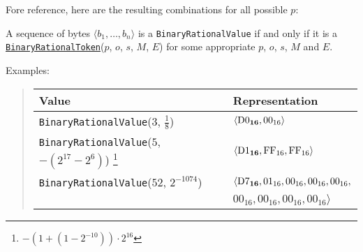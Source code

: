 \documentclass{dbor-article}
\newcommand{\HexNumber}[1]{\mathrm{#1}_{16}}
\newcommand{\DborSyntaxIdent}[1]{\texttt{#1}}
\newcommand{\DborSyntaxIdentRef}[1]{\hyperlink{sec:def:#1}{\DborSyntaxIdent{#1}}}
\newcommand{\DborFirstByte}[2]{\mathbf{\textcolor{#1}{\HexNumber{#2}}}}
\newcommand{\DborFirstByteNumber}[1]{\DborFirstByte{black}{#1}}
\newcommand{\DborNextByte}[1]{\HexNumber{#1}}
\begin{document}
    \smallskip
    \noindent
    Fore reference, here are the resulting combinations for all possible $p$:
    \nolinebreak
    \begin{quote}
    \end{quote}

    A sequence of bytes $\langle b_1, \ldots, b_n\rangle$ is a \DborSyntaxIdent{BinaryRationalValue} if and only if
    it is a \DborSyntaxIdentRef{BinaryRationalToken}($p$, $o$, $s$, $M$, $E$) for some
    appropriate $p$, $o$, $s$, $M$ and $E$.

    \smallskip
    \noindent
    Examples:
    \nolinebreak
    \begin{quote}    
        \begin{tabular}{ll}
            \toprule
            Value & Representation \\
            \midrule
            \DborSyntaxIdent{BinaryRationalValue}($3$, $\frac{1}{8}$) 
                &  $\langle \DborFirstByteNumber{D0}, \DborNextByte{00} \rangle$ \\
            \DborSyntaxIdent{BinaryRationalValue}($5$, $-(2^{17} - 2^6)$)%
                \footnote{$-\left(1 + (1 - 2^{-10})\right) \cdot 2^{16}$}
                &  $\langle \DborFirstByteNumber{D1}, \DborNextByte{FF}, \DborNextByte{FF} \rangle$ \\
            \DborSyntaxIdent{BinaryRationalValue}($52$, $2^{-1074}$) 
                &  $\langle \DborFirstByteNumber{D7}, \DborNextByte{01}, \DborNextByte{00},
                                                      \DborNextByte{00}, \DborNextByte{00},$ \\
                &  $                                  \DborNextByte{00}, \DborNextByte{00},
                                                      \DborNextByte{00}, \DborNextByte{00} \rangle$ \\
            \bottomrule
        \end{tabular}
    \end{quote}
\end{document}
